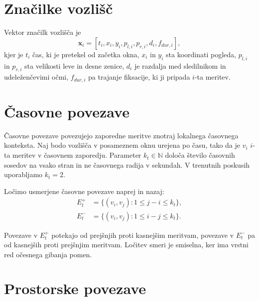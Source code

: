 \section{Značilke vozlišč}
\label{subsec:znacilke-vozlisca}

Vektor značilk vozlišča je
\begin{equation}
    \mathbf{x}_i =
    \left[
        t_i,
        x_i,
        y_i,
        p_{l,i},
        p_{r,i},
        d_i,
        f_{dur,i}
    \right],
\end{equation}
kjer je $t_i$ čas, ki je pretekel od začetka okna, $x_i$ in $y_i$ sta koordinati pogleda, $p_{l,i}$ in $p_{r,i}$ sta velikosti leve in desne zenice, $d_i$ je razdalja med sledilnikom in udeleženčevimi očmi, $f_{dur,i}$ pa trajanje fiksacije, ki ji pripada $i$-ta meritev.


\section{Časovne povezave}
\label{subsec:casovne-povezave}

Časovne povezave povezujejo zaporedne meritve znotraj lokalnega časovnega konteksta.
Naj bodo vozlišča v posameznem oknu urejena po času, tako da je $v_i$ $i$-ta meritev v časovnem zaporedju.
Parameter $k_t \in \mathbb{N}$ določa število časovnih sosedov na vsako stran in ne časovnega radija v sekundah.
V trenutnih poskusih uporabljamo $k_t = 2$.

Ločimo usmerjene časovne povezave naprej in nazaj:
\begin{align}
    E_t^+ &= \{(v_i, v_j) : 1 \leq j - i \leq k_t\}, \\
    E_t^- &= \{(v_i, v_j) : 1 \leq i - j \leq k_t\}.
\end{align}

Povezave v $E_t^+$ potekajo od prejšnjih proti kasnejšim meritvam, povezave v $E_t^-$ pa od kasnejših proti prejšnjim meritvam.
Ločitev smeri je smiselna, ker ima vrstni red očesnega gibanja pomen.


\section{Prostorske povezave}
\label{subsec:prostorske-povezave}

